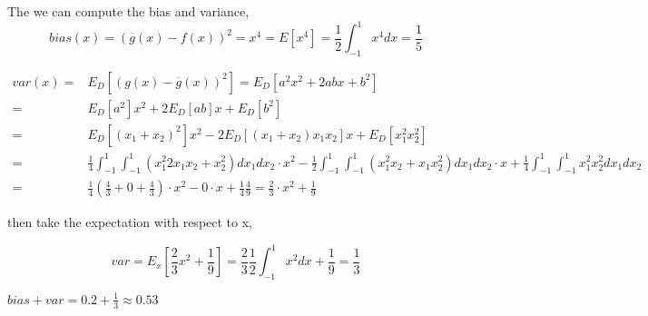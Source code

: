 \documentclass[11pt]{article}
\begin{document}
\begin{enumerate}
The we can compute the bias and variance, 
$$bias(x) = (\overline{g}(x)-f(x))^2 = x^4 = E[x^4] = \frac{1}{2}\int_{-1}^{1}x^4dx = \frac{1}{5}$$

\begin{equation}
\begin{aligned}
var(x) =& E_D[(g(x) - \overline{g}(x))^2] = E_D[a^2x^2 + 2abx + b^2]\\
=& E_D[a^2]x^2 + 2E_D[ab]x + E_D[b^2]\\
=& E_D[(x_1 + x_2)^2] x^2 - 2E_D[(x_1+x_2)x_1x_2]x + E_D[x_1^2x_2^2]\\
=& \frac{1}{4}\int_{-1}^{1}\int_{-1}^{1}(x_1^2 2x_1x_2 + x_2^2)dx_1dx_2 \cdot x^2 - \frac{1}{2}\int_{-1}^{1}\int_{-1}^{1}(x_1^2x_2+x_1x_2^2)dx_1dx_2\cdot x + \frac{1}{4}\int_{-1}^{1}\int_{-1}^{1}x_1^2x_2^2dx_1dx_2\\
=& \frac{1}{4}(\frac{4}{3}+0+\frac{4}{3}) \cdot x^2 - 0\cdot x + \frac{1}{4}\frac{4}{9} = \frac{2}{3}\cdot x^2 + \frac{1}{9}
\end{aligned}
\end{equation}

then take the expectation with respect to x,

$$var = E_x[\frac{2}{3}x^2 + \frac{1}{9}] = \frac{2}{3}\frac{1}{2}\int_{-1}^{1}x^2dx + \frac{1}{9} = \frac{1}{3}$$

$bias + var =  0.2 + \frac{1}{3} \approx 0.53$



\end{enumerate}

\pagebreak
\end{document}
